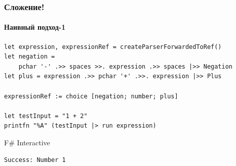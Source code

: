 \documentclass[xetex,mathserif,serif]{beamer}
\begin{document}
    \begin{frame}[fragile]
        \frametitle{Сложение!}
        \framesubtitle{Наивный подход-1}
        \begin{verbatim}
let expression, expressionRef = createParserForwardedToRef()
let negation = 
    pchar '-' .>> spaces >>. expression .>> spaces |>> Negation
let plus = expression .>> pchar '+' .>>. expression |>> Plus

expressionRef := choice [negation; number; plus]

let testInput = "1 + 2"
printfn "%A" (testInput |> run expression)
        \end{verbatim}

        \begin{exampleblock}{F\# Interactive}
            \begin{verbatim}
Success: Number 1
            \end{verbatim}
        \end{exampleblock}
    \end{frame}
\end{document}
